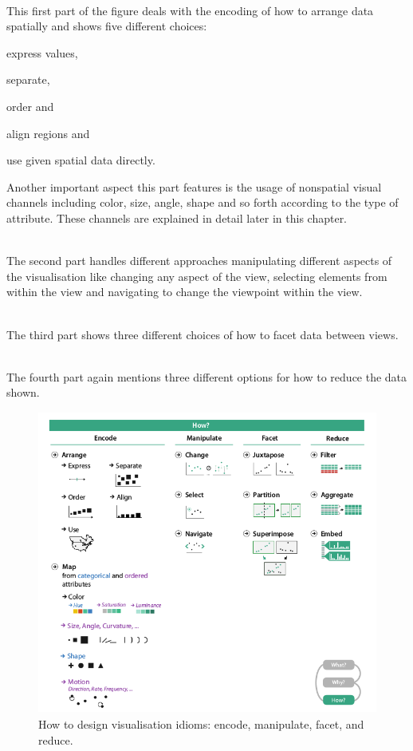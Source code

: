 \begin{enumerate}

 \hfill \\
This first part of the figure deals with the encoding of how to arrange data spatially and shows five different choices:
    \begin{enumerate*}[label={(\arabic*)}]
    \item express values,
    \item separate,
    \item order and
    \item align regions and
    \item use given spatial data directly.
    \end{enumerate*}
Another important aspect this part features is the usage of nonspatial visual channels including color, size, angle, shape and so forth according to the type of attribute. These channels are explained in detail later in this chapter.

 \hfill \\
The second part handles different approaches manipulating different aspects of the visualisation like changing any aspect of the view, selecting elements from within the view and navigating to change the viewpoint within the view.

 \hfill \\
The third part shows three different choices of how to facet data between views.

 \hfill \\
The fourth part again mentions three different options for how to reduce the data shown.

\end{enumerate}

\begin{figure}[!hbt]
\centering
\includegraphics[height=10cm,keepaspectratio]{images/basics/how.png}
\caption[
    How to design visualisation idioms: encode, manipulate, facet, and reduce .
]{How to design visualisation idioms: encode, manipulate, facet, and reduce.}
\label{fig:how}
\end{figure}

